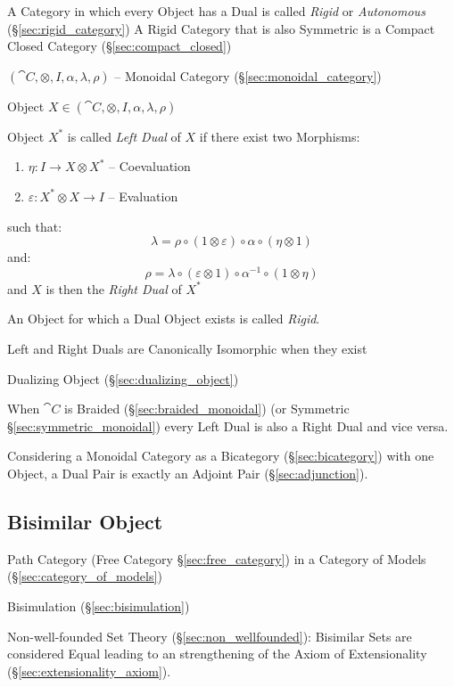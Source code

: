 A Category in which every Object has a Dual is called \emph{Rigid} or
\emph{Autonomous} (\S\ref{sec:rigid_category}) A Rigid Category that
is also Symmetric is a Compact Closed Category
(\S\ref{sec:compact_closed})

$(\cat{C}, \otimes, I, \alpha, \lambda, \rho)$ -- Monoidal Category
(\S\ref{sec:monoidal_category})

Object $X \in (\cat{C}, \otimes, I, \alpha, \lambda, \rho)$

Object $X^*$ is called \emph{Left Dual} of $X$ if there exist two
Morphisms:
\begin{enumerate}
  \item $\eta : I \rightarrow X \otimes X^*$ -- Coevaluation
  \item $\varepsilon : X^* \otimes X \rightarrow I$ -- Evaluation
\end{enumerate}
such that:
\[
  \lambda = \rho \circ (1 \otimes \varepsilon) \circ \alpha \circ
    (\eta \otimes 1)
\]
and:
\[
  \rho = \lambda \circ (\varepsilon \otimes 1) \circ \alpha^{-1}
    \circ (1 \otimes \eta)
\]
and $X$ is then the \emph{Right Dual} of $X^*$

An Object for which a Dual Object exists is called \emph{Rigid}.

Left and Right Duals are Canonically Isomorphic when they exist

Dualizing Object (\S\ref{sec:dualizing_object})

When $\cat{C}$ is Braided (\S\ref{sec:braided_monoidal}) (or Symmetric
\S\ref{sec:symmetric_monoidal}) every Left Dual is also a Right Dual
and vice versa.

Considering a Monoidal Category as a Bicategory
(\S\ref{sec:bicategory}) with one Object, a Dual Pair is exactly an
Adjoint Pair (\S\ref{sec:adjunction}).



\subsection{Bisimilar Object}\label{sec:bisimilar_object}

Path Category (Free Category \S\ref{sec:free_category}) in a Category
of Models (\S\ref{sec:category_of_models})

Bisimulation (\S\ref{sec:bisimulation})

Non-well-founded Set Theory (\S\ref{sec:non_wellfounded}): Bisimilar
Sets are considered Equal leading to an strengthening of the Axiom of
Extensionality (\S\ref{sec:extensionality_axiom}).



